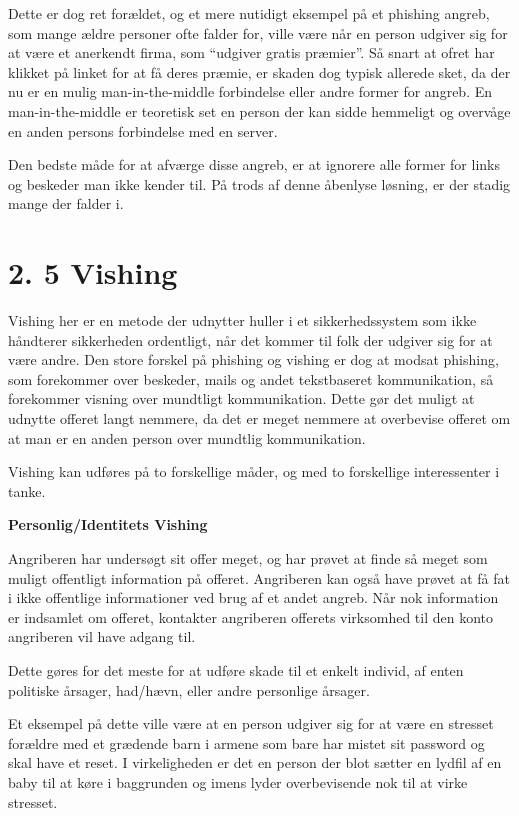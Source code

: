 \documentclass[11pt]{report}
\begin{document}
Dette er dog ret forældet, og et mere nutidigt eksempel på et phishing angreb, som mange ældre personer ofte falder for, ville være når en person udgiver sig for at være et anerkendt firma, som “udgiver gratis præmier”. Så snart at ofret har klikket på linket for at få deres præmie, er skaden dog typisk allerede sket, da der nu er en mulig man-in-the-middle forbindelse eller andre former for angreb. En man-in-the-middle er teoretisk set en person der kan sidde hemmeligt og overvåge en anden persons forbindelse med en server.


Den bedste måde for at afværge disse angreb, er at ignorere alle former for links og beskeder man ikke kender til. På trods af denne åbenlyse løsning, er der stadig mange der falder i.
\section*{2. 5 Vishing}
Vishing her er en metode der udnytter huller i et sikkerhedssystem som ikke håndterer sikkerheden ordentligt, når det kommer til folk der udgiver sig for at være andre. Den store forskel på phishing og vishing er dog at modsat phishing, som forekommer over beskeder, mails og andet tekstbaseret kommunikation, så forekommer visning over mundtligt kommunikation. Dette gør det muligt at udnytte offeret langt nemmere, da det er meget nemmere at overbevise offeret om at man er en anden person over mundtlig kommunikation.

Vishing kan udføres på to forskellige måder, og med to forskellige interessenter i tanke. 

\noindent\textbf{Personlig/Identitets Vishing}
\par Angriberen har undersøgt sit offer meget, og har prøvet at finde så meget som muligt offentligt information på offeret. Angriberen kan også have prøvet at få fat i ikke offentlige informationer ved brug af et andet angreb. Når nok information er indsamlet om offeret, kontakter angriberen offerets virksomhed til den konto angriberen vil have adgang til. 

Dette gøres for det meste for at udføre skade til et enkelt individ, af enten politiske årsager, had/hævn, eller andre personlige årsager.

Et eksempel på dette ville være at en person udgiver sig for at være en stresset forældre med et grædende barn i armene som bare har mistet sit password og skal have et reset. I virkeligheden er det en person der blot sætter en lydfil af en baby til at køre i baggrunden og imens lyder overbevisende nok til at virke stresset.
\end{document}

